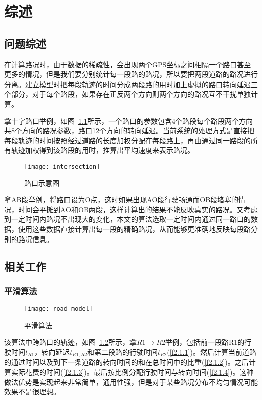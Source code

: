 \chapter{综述}
\label{chap2}

\section{问题综述}
在计算路况时，由于数据的稀疏性，会出现两个GPS坐标之间相隔一个路口甚至更多的情况，但是我们要分别统计每一段路的路况，所以要把两段道路的路况进行分离。建立模型时把每段轨迹的时间分成两段路的用时加上虚拟的路口转向延迟三个部分，对于每个路段，如果存在正反两个方向则两个方向的路况互不干扰单独计算。

拿十字路口举例，如图~\ref{fig:1}所示，一个路口的参数包含4个路段每个路段两个方向共8个方向的路况参数，路口12个方向的转向延迟。当前系统的处理方式是直接把每段轨迹的时间按照经过道路的长度加权分配在每段路上，再由通过同一路段的所有轨迹加权得到该路段的用时，推算出平均速度来表示路况。

\begin{figure}[H] 
  \centering
  \texttt{[image: intersection]}
  \caption{路口示意图}
  \label{fig:1}
\end{figure}

拿AB段举例，将路口设为O点，这时如果出现AO段行驶畅通而OB段堵塞的情况，时间会平摊到AO和OB两段，这样计算出的结果不能反映真实的路况。又考虑到一定时间内路况不出现大的变化，本文的算法选取一定时间内通过同一路口的数据，使用这些数据直接计算出每一段的精确路况，从而能够更准确地反映每段路分别的路况信息。


\section{相关工作}
\label{sec:related_work}

\subsection{平滑算法}

\begin{figure}[H] 
  \centering
  \texttt{[image: road\_model]}
  \caption{平滑算法}
  \label{fig:2}
\end{figure}

该算法中跨路口的轨迹，如图~\ref{fig:2}所示，拿$R1\to R2$举例，包括前一段路R1的行驶时间$t_{R1}$，转向延迟$t_{R1,R2}$和第二段路的行驶时间$t_{R2}$(\ref{f2.1.1})。然后计算当前道路的通过时间以及到下一条道路的转向时间的和在总时间中的比重(\ref{f2.1.2})。之后计算实际花费的时间(\ref{f2.1.3})。最后按比例分配行驶时间与转向时间(\ref{f2.1.4})。这种做法优势是实现起来非常简单，通用性强，但是对于某些路况分布不均匀情况可能效果不是很理想。

